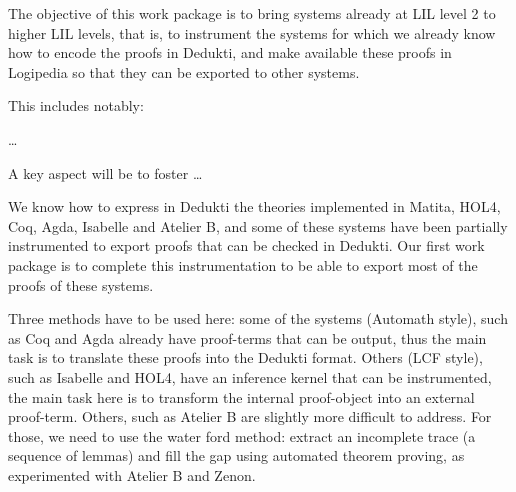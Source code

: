\begin{workpackage}[id=instrumentation,wphases=0-48,type=RTD,
  short=Instrument Provers,%
  title=Instrument proof systems to produce Dedukti proof,
  lead=Del,
  BolRM=16,
  InrRM=22, %
  DelRM=24,
  GotRM=18,
  TumRM=5]  %


\begin{wpobjectives}
  The objective of this work package is to bring systems already at
  LIL level 2 to higher LIL levels, that is, to instrument the systems
  for which we already know how to encode the proofs in Dedukti, and
  make available these proofs in Logipedia so that
  they can be exported to other systems.

This includes notably:
  \begin{compactitem}
  \item \ldots
  \end{compactitem}
  A key aspect will be to foster \ldots
\end{wpobjectives}


\begin{wpdescription}
We know how to express in Dedukti the theories implemented in Matita,
HOL4, Coq, Agda, Isabelle and Atelier B, and some of these systems
have been partially instrumented to export proofs that can be checked
in Dedukti. Our first work package is to complete this instrumentation
to be able to export most of the proofs of these systems.

Three methods have to be used here: some of the systems
(Automath style), such as Coq and Agda already have
proof-terms that can be output, thus the main task is to translate
these proofs into the Dedukti format. Others (LCF style), such as
Isabelle and HOL4, have an inference kernel that can be
instrumented, the main task here is to transform
the internal proof-object into an external proof-term. Others, such as
Atelier B are slightly more difficult to address. For those,
we need to use the water ford method: extract an incomplete trace (a
sequence of lemmas) and fill the gap using automated theorem proving,
as experimented with Atelier B and Zenon.
\end{wpdescription}


\end{workpackage}
